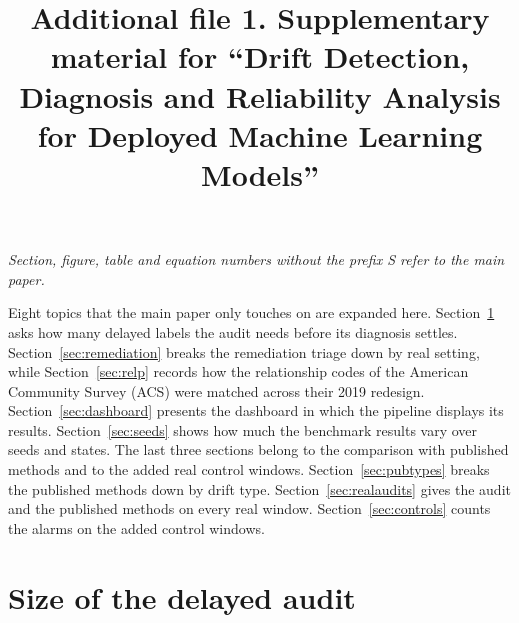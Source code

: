 \documentclass[pdflatex,sn-basic]{sn-jnl}
\begin{document}
\title[Additional file 1. Supplementary material for ``Drift Detection, Diagnosis and Reliability Analysis for Deployed Machine Learning Models'']{Additional file 1. Supplementary material for ``Drift Detection, Diagnosis and Reliability Analysis for Deployed Machine Learning Models''}

\author*[1]{ }
\author[1]{ }
\author[1]{ }
\author[1]{ }
\author[1]{ }




\maketitle

\noindent\emph{Section, figure, table and equation numbers without the prefix S refer to the main paper.}

\renewcommand{\thesection}{S\arabic{section}}
\renewcommand{\thefigure}{S\arabic{figure}}
\renewcommand{\thetable}{S\arabic{table}}
\renewcommand{\theequation}{S\arabic{equation}}

Eight topics that the main paper only touches on are expanded here. Section~\ref{sec:budget} asks how many delayed labels the audit needs before its diagnosis settles. Section~\ref{sec:remediation} breaks the remediation triage down by real setting, while Section~\ref{sec:relp} records how the relationship codes of the American Community Survey (ACS) were matched across their 2019 redesign. Section~\ref{sec:dashboard} presents the dashboard in which the pipeline displays its results. Section~\ref{sec:seeds} shows how much the benchmark results vary over seeds and states. The last three sections belong to the comparison with published methods and to the added real control windows. Section~\ref{sec:pubtypes} breaks the published methods down by drift type. Section~\ref{sec:realaudits} gives the audit and the published methods on every real window. Section~\ref{sec:controls} counts the alarms on the added control windows.

\section{Size of the delayed audit}\label{sec:budget}
\end{document}
